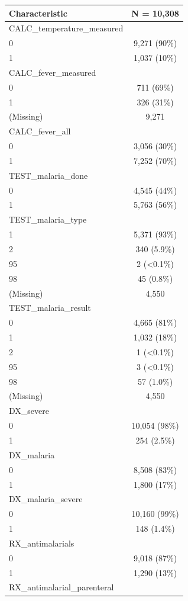 \documentclass[
  letterpaper,
  DIV=11,
  numbers=noendperiod,
  oneside]{scrreprt}
\begin{document}
\begin{longtable}[]{@{}lc@{}}
\toprule()
\textbf{Characteristic} & \textbf{N = 10,308} \\
\midrule()
\endhead
CALC\_temperature\_measured & \\
0 & 9,271 (90\%) \\
1 & 1,037 (10\%) \\
CALC\_fever\_measured & \\
0 & 711 (69\%) \\
1 & 326 (31\%) \\
(Missing) & 9,271 \\
CALC\_fever\_all & \\
0 & 3,056 (30\%) \\
1 & 7,252 (70\%) \\
TEST\_malaria\_done & \\
0 & 4,545 (44\%) \\
1 & 5,763 (56\%) \\
TEST\_malaria\_type & \\
1 & 5,371 (93\%) \\
2 & 340 (5.9\%) \\
95 & 2 (\textless0.1\%) \\
98 & 45 (0.8\%) \\
(Missing) & 4,550 \\
TEST\_malaria\_result & \\
0 & 4,665 (81\%) \\
1 & 1,032 (18\%) \\
2 & 1 (\textless0.1\%) \\
95 & 3 (\textless0.1\%) \\
98 & 57 (1.0\%) \\
(Missing) & 4,550 \\
DX\_severe & \\
0 & 10,054 (98\%) \\
1 & 254 (2.5\%) \\
DX\_malaria & \\
0 & 8,508 (83\%) \\
1 & 1,800 (17\%) \\
DX\_malaria\_severe & \\
0 & 10,160 (99\%) \\
1 & 148 (1.4\%) \\
RX\_antimalarials & \\
0 & 9,018 (87\%) \\
1 & 1,290 (13\%) \\
RX\_antimalarial\_parenteral & \\

\end{longtable}
\end{document}
